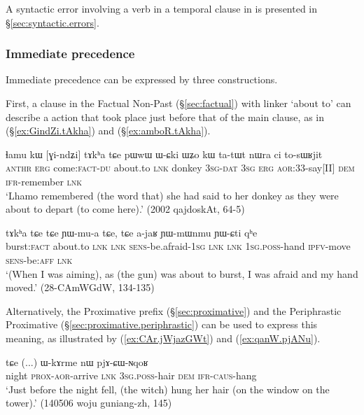 A syntactic error involving a verb in a temporal clause in   is presented in §\ref{sec:syntactic.errors}.

 \subsubsection{Immediate precedence}
Immediate precedence can be expressed by three constructions.

First, a clause in the Factual Non-Past (§\ref{sec:factual}) with linker  `about to' can describe a action that took place just before that of the main clause, as in (§\ref{ex:GindZi.tAkha}) and (§\ref{ex:amboR.tAkha}).
 
\begin{exe}
\ex \label{ex:GindZi.tAkha}
\gll ɬamu kɯ [ɣi-ndʑi] tɤkʰa tɕe pɯwɯ ɯ-ɕki ɯʑo kɯ ta-tɯt nɯra ci to-sɯʁjit \\
\textsc{anthr} \textsc{erg} come:\textsc{fact}-\textsc{du} about.to \textsc{lnk} donkey \textsc{3sg}-\textsc{dat} \textsc{3sg} \textsc{erg} \textsc{aor}:3\fl{}3-say[II] \textsc{dem} \textsc{ifr}-remember \textsc{lnk} \\
\glt  `Lhamo remembered (the word that) she had said to her donkey as they were about to depart (to come here).' (2002 qajdoskAt, 64-5)
\end{exe}

\begin{exe}
\ex \label{ex:amboR.tAkha}
\gll [amboʁ] tɤkʰa tɕe tɕe ɲɯ-mu-a tɕe, tɕe a-jaʁ ɲɯ-mɯnmu ɲɯ-ɕti qʰe  \\
burst:\textsc{fact}  about.to \textsc{lnk}  \textsc{lnk} \textsc{sens}-be.afraid-\textsc{1sg}  \textsc{lnk}  \textsc{lnk} \textsc{1sg}.\textsc{poss}-hand \textsc{ipfv}-move \textsc{sens}-be:\textsc{aff} \textsc{lnk} \\
\glt  `(When I was aiming), as (the gun) was about to burst, I was afraid and my hand moved.' (28-CAmWGdW, 134-135)
\end{exe}


Alternatively, the  Proximative prefix (§\ref{sec:proximative}) and the Periphrastic Proximative (§\ref{sec:proximative.periphrastic}) can be used to express this meaning, as illustrated by (\ref{ex:CAr.jWjazGWt}) and (\ref{ex:qanW.pjANu}).


\begin{exe}
\ex \label{ex:CAr.jWjazGWt}
 tɕe (...) ɯ-kɤrme nɯ pjɤ-ɕɯ-ɴqoʁ \\
night \textsc{prox}-\textsc{aor}-arrive \textsc{lnk} { } \textsc{3sg}.\textsc{poss}-hair \textsc{dem} \textsc{ifr}-\textsc{caus}-hang \\
\glt `Just before the night fell, (the witch) hung her hair (on the window on the tower).' (140506 woju guniang-zh, 145)
\end{exe}


